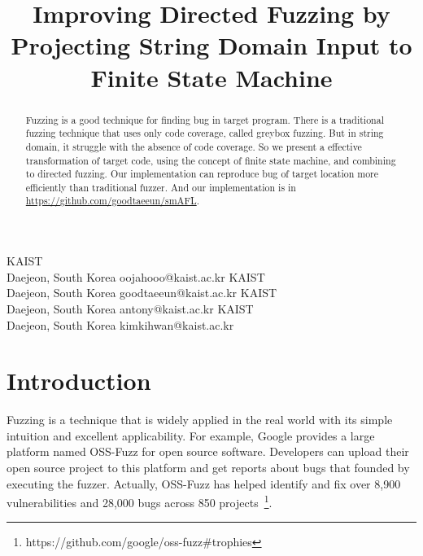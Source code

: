 \documentclass[12pt]{sigplanconf}
\begin{document}
\setlength{\pdfpageheight}{\paperheight}
\setlength{\pdfpagewidth}{\paperwidth}


\title{Improving Directed Fuzzing by Projecting String Domain Input to Finite State Machine}

{KAIST \\
    Daejeon, South Korea
}
{oojahooo@kaist.ac.kr}
{KAIST \\
    Daejeon, South Korea
}
{goodtaeeun@kaist.ac.kr}
{KAIST \\
    Daejeon, South Korea
}
{antony@kaist.ac.kr}
{KAIST \\
    Daejeon, South Korea
}
{kimkihwan@kaist.ac.kr}

\maketitle

\begin{abstract}
    Fuzzing is a good technique for finding bug in target program. There is a
    traditional fuzzing technique that uses only code coverage, called greybox
    fuzzing. But in string domain, it struggle with the absence of code coverage.
    So we present a effective transformation of target code, using the concept of
    finite state machine, and combining to directed fuzzing. Our implementation
    can reproduce bug of target location more efficiently than traditional fuzzer.
    And our implementation is in \url{https://github.com/goodtaeeun/smAFL}.
\end{abstract}

\section{Introduction}
Fuzzing is a technique that is widely applied in the real world with its simple intuition and excellent applicability.
For example, Google provides a large platform named OSS-Fuzz for open source software. Developers can upload their open
source project to this platform and get reports about bugs that founded by executing the fuzzer. Actually, OSS-Fuzz has
helped identify and fix over 8,900 vulnerabilities and 28,000 bugs across 850 projects~\footnote{https://github.com/google/oss-fuzz\#trophies}.
\end{document}
